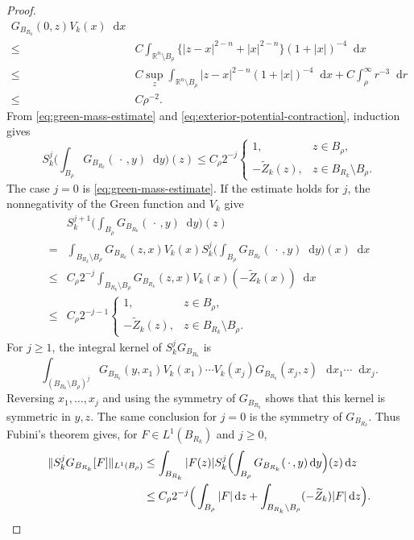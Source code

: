 \documentclass[10pt,a4paper]{amsart}
\newcommand{\R}{\mathbb R}
\newcommand{\dd}{\mathop{}\!\mathrm{d}}
\theoremstyle{plain}
\theoremstyle{remark}
\begin{document}
\begin{proof}
{\[\begin{aligned}
      {G_{B_{R_k}}(0,z)}V_k(x)\dd x\\
 {}\le{}&C\int_{\R^n\setminus B_\rho}
 \big\{|z-x|^{2-n}+|x|^{2-n}\big\}(1+|x|)^{-4}\dd x
 \\[-2mm]
 {}\le{}&C\sup_z
 \int_{\R^n\setminus B_\rho}|z-x|^{2-n}(1+|x|)^{-4}\dd x
 +C\int_\rho^\infty r^{-3}\dd r\\
 {}\le{}&C\rho^{-2}.
\end{aligned}
\]
}
From \eqref{eq:green-mass-estimate} and
\eqref{eq:exterior-potential-contraction}, induction gives
{
\[
 S_k^j\bigg(\int_{B_\rho}G_{B_{R_k}}(\,\cdot\,,y)\dd y\bigg)(z)
 \le C_\rho 2^{-j}
 \begin{cases}
  1,&z\in B_\rho,\\
 -\widetilde Z_k(z),&z\in B_{R_k}\setminus B_\rho.
 \end{cases}
\]
}
The case $j=0$ is \eqref{eq:green-mass-estimate}.  If the estimate holds
for $j$, the nonnegativity of the Green function and $V_k$ 
give
 {
\[
\begin{aligned}
 &S_k^{j+1}\bigg(\int_{B_\rho}
 G_{B_{R_k}}(\,\cdot\,,y)\dd y\bigg)(z)\\
 {}={}&\int_{B_{R_k}\setminus B_\rho}
 G_{B_{R_k}}(z,x)V_k(x)
 S_k^j\bigg(\int_{B_\rho}
 G_{B_{R_k}}(\,\cdot\,,y)\dd y\bigg)(x)\dd x\\
 {}\le{}&C_\rho 2^{-j}
 \int_{B_{R_k}\setminus B_\rho}
 G_{B_{R_k}}(z,x)V_k(x)(-\widetilde Z_k(x))\dd x\\
 {}\le{}&C_\rho 2^{-j-1}
 \begin{cases}
  1,&z\in B_\rho,\\
  -\widetilde Z_k(z),&z\in B_{R_k}\setminus B_\rho.
 \end{cases}
\end{aligned}
\]
}
For \(j\ge1\), the integral kernel of
\(S_k^jG_{B_{R_k}}\) is
\[
 \int_{(B_{R_k}\setminus B_\rho)^j}
 G_{B_{R_k}}(y,x_1)V_k(x_1)\cdots
 V_k(x_j)G_{B_{R_k}}(x_j,z)\,
 \dd x_1\cdots\dd x_j.
\]
Reversing \(x_1,\ldots,x_j\) and using the symmetry of
\(G_{B_{R_k}}\) shows that this kernel is symmetric in \(y,z\).
The same conclusion for \(j=0\) is the symmetry of \(G_{B_{R_k}}\).
Thus Fubini's theorem gives, for
\(F\in L^1(B_{R_k})\) and \(j\ge0\),
{
\[
\begin{aligned}
 \|S_k^jG_{B_{R_k}}[F]\|_{L^1(B_\rho)}
 &\le\int_{B_{R_k}}|F(z)|
 S_k^j\Bigl(\int_{B_\rho}G_{B_{R_k}}(\,\cdot\,,y)\dd y\Bigr)(z)\dd z\\
 &\le C_\rho 2^{-j}\Big(
   \int_{B_\rho}|F|\dd z
   +\int_{B_{R_k}\setminus B_\rho}(-\widetilde Z_k)|F|\dd z\Big).
\end{aligned}
\]}
\end{proof}
\end{document}
